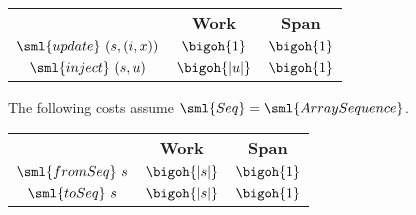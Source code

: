 \begin{cluster}
\label{grp:cst:st-seq::updates}

\begin{costspec}[Updates]
\label{cst:st-seq::updates}
\begin{tabular}{ccc}
& \textbf{Work} & \textbf{Span} \\
$\sml{update}~(s,(i,x))$ & $\bigoh{1}$ & $\bigoh{1}$ \\
$\sml{inject}~(s,u)$ & $\bigoh{|u|}$ & $\bigoh{1}$
\end{tabular}

\end{costspec}
\end{cluster}

\begin{cluster}
\label{grp:cst:st-seq::conversion}

\begin{costspec}[Conversion]
\label{cst:st-seq::conversion}
The following costs assume $\sml{Seq} = \sml{ArraySequence}$.
\begin{tabular}{ccc}
& \textbf{Work} & \textbf{Span} \\
$\sml{fromSeq}~s$ & $\bigoh{|s|}$ & $\bigoh{1}$ \\
$\sml{toSeq}~s$ & $\bigoh{|s|}$ & $\bigoh{1}$
\end{tabular}

\end{costspec}
\end{cluster}

